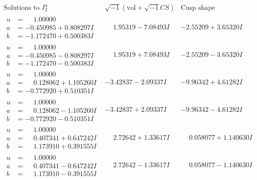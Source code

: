 \documentclass[1p]{elsarticle_modified}
\theoremstyle{definition}
\newcommand{\I}{\sqrt{-1}}
\begin{document}
$$\begin{array}{c|c|c}  
\text{Solutions to }I^u_{2}& \I (\text{vol} + \sqrt{-1}CS) & \text{Cusp shape}\\
 \hline 
\begin{aligned}
u &= \phantom{-}1.00000\phantom{ +0.000000I} \\
a &= -0.450985 + 0.808297 I \\
b &= -1.172470 + 0.500383 I\end{aligned}
 & \phantom{-}1.95319 - 7.08493 I & -2.55209 + 3.65320 I \\ \hline\begin{aligned}
u &= \phantom{-}1.00000\phantom{ +0.000000I} \\
a &= -0.450985 - 0.808297 I \\
b &= -1.172470 - 0.500383 I\end{aligned}
 & \phantom{-}1.95319 + 7.08493 I & -2.55209 - 3.65320 I \\ \hline\begin{aligned}
u &= \phantom{-}1.00000\phantom{ +0.000000I} \\
a &= \phantom{-}0.128062 + 1.105260 I \\
b &= -0.772920 + 0.510351 I\end{aligned}
 & -3.42837 - 2.09337 I & -9.96342 + 4.61282 I \\ \hline\begin{aligned}
u &= \phantom{-}1.00000\phantom{ +0.000000I} \\
a &= \phantom{-}0.128062 - 1.105260 I \\
b &= -0.772920 - 0.510351 I\end{aligned}
 & -3.42837 + 2.09337 I & -9.96342 - 4.61282 I \\ \hline\begin{aligned}
u &= \phantom{-}1.00000\phantom{ +0.000000I} \\
a &= \phantom{-}0.407341 + 0.647242 I \\
b &= \phantom{-}1.173910 + 0.391555 I\end{aligned}
 & \phantom{-}2.72642 + 1.33617 I & \phantom{-}0.058077 + 1.140630 I \\ \hline\begin{aligned}
u &= \phantom{-}1.00000\phantom{ +0.000000I} \\
a &= \phantom{-}0.407341 - 0.647242 I \\
b &= \phantom{-}1.173910 - 0.391555 I\end{aligned}
 & \phantom{-}2.72642 - 1.33617 I & \phantom{-}0.058077 - 1.140630 I \\ \hline\begin{aligned}

\end{aligned}
\end{array}$$
\end{document}
